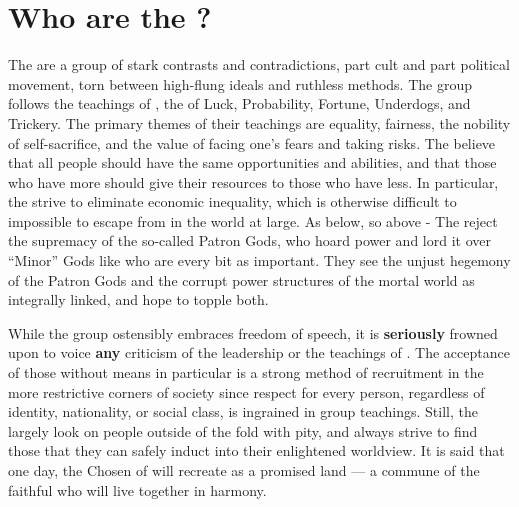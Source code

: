 \documentclass[blue]{GL2020}
\begin{document}
\name{\bCultAvenger{}}

\section*{Who are the \pGoaties{}?}
The \pGoaties{} are a group of stark contrasts and contradictions, part cult and part political movement, torn between high-flung ideals and ruthless methods. The group follows the teachings of \cGenesis{}, the \cGenesis{\Deity} of Luck, Probability, Fortune, Underdogs, and Trickery. The primary themes of their teachings are equality, fairness, the nobility of self-sacrifice, and the value of facing one's fears and taking risks. The \pGoaties{} believe that all people should have the same opportunities and abilities, and that those who have more should give their resources to those who have less. In particular, the \pGoaties{} strive to eliminate economic inequality, which is otherwise difficult to impossible to escape from in the world at large. As below, so above - The \pGoaties{} reject the supremacy of the so-called Patron Gods, who hoard power and lord it over “Minor” Gods like \cGenesis{} who are every bit as important. They see the unjust hegemony of the Patron Gods and the corrupt power structures of the mortal world as integrally linked, and hope to topple both.

While the group ostensibly embraces freedom of speech, it is \textbf{seriously} frowned upon to voice \textbf{any} criticism of the leadership or the teachings of \cGenesis{}. The acceptance of those without means in particular is a strong method of recruitment in the more restrictive corners of society since respect for every person, regardless of identity, nationality, or social class, is ingrained in group teachings. Still, the \pGoaties{} largely look on people outside of the fold with pity, and always strive to find those that they can safely induct into their enlightened worldview. It is said that one day, the Chosen of \cGenesis{} will recreate \pEarth{} as a promised land — a commune of the faithful who will live together in harmony.
\end{document}
